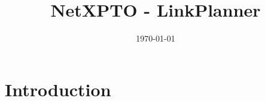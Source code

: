 \title{NetXPTO - LinkPlanner}
\author{}
\date{\today}
\maketitle

\tableofcontents

\chapter*{Introduction}







